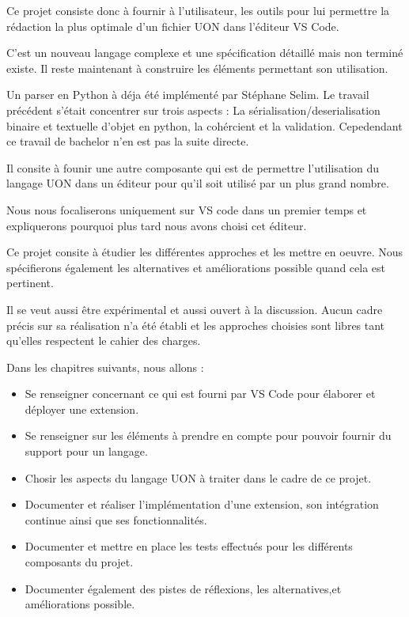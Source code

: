 \documentclass[
    iict, %
    il, %
]{heig-tb}
\begin{document}
Ce projet consiste donc à fournir à l'utilisateur, les outils pour lui permettre la rédaction la plus optimale d'un fichier UON dans l'éditeur VS Code.

C'est un nouveau langage complexe et une spécification détaillé mais non terminé existe. Il reste maintenant à construire les éléments permettant son utilisation.

Un parser en Python à déja été implémenté par Stéphane Selim.
Le travail précédent s'était concentrer sur trois aspects : La sérialisation/deserialisation binaire et textuelle d'objet en python, la cohércient et la validation.
Cepedendant ce travail de bachelor n'en est pas la suite directe.

Il consite à founir une autre composante qui est de permettre l'utilisation du langage UON dans un éditeur pour qu'il soit utilisé par un plus grand nombre.

Nous nous focaliserons uniquement sur VS code dans un premier temps et expliquerons pourquoi plus tard nous avons choisi cet éditeur.

Ce projet consite à étudier les différentes approches et les mettre en oeuvre. Nous spécifierons également les alternatives et améliorations possible quand cela est pertinent.

Il se veut aussi être expérimental et aussi ouvert à la discussion.
Aucun cadre précis sur sa réalisation n'a été établi et les approches choisies sont libres tant qu'elles respectent le cahier des charges.

Dans les chapitres suivants, nous allons :

\begin{itemize}
    \item Se renseigner concernant ce qui est fourni par VS Code pour élaborer et déployer une extension.
    \item Se renseigner sur les éléments à prendre en compte pour pouvoir fournir du support pour un langage.
    \item Chosir les aspects du langage UON à traiter dans le cadre de ce projet.
    \item Documenter et réaliser l'implémentation d'une extension, son intégration continue ainsi que ses fonctionnalités.
    \item Documenter et mettre en place les tests effectués pour les différents composants du projet.
    \item Documenter également des pistes de réflexions, les alternatives,et améliorations possible.
\end{itemize}
\end{document}
